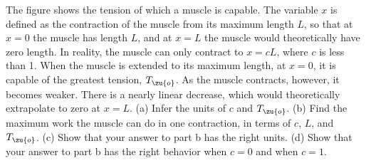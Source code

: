 The figure shows the tension of which a muscle is capable.
The variable $x$ is defined as the contraction of the muscle from its maximum length $L$, so that at
$x=0$ the muscle has length $L$, and at $x=L$ the muscle would theoretically have zero length.
In reality, the muscle can only contract to $x=cL$, where $c$ is less than 1.
When the muscle is extended to its maximum length, at $x=0$, it is capable of the greatest tension, $T_\zu{o}$.
As the muscle contracts, however, it becomes weaker. There is a nearly linear
decrease, which would theoretically extrapolate to zero at $x=L$.
(a)  Infer the units of $c$ and $T_\zu{o}$.
(b) Find the maximum work the muscle can do in one contraction, in terms of $c$, $L$, and $T_\zu{o}$.
(c) Show that your answer to part b has the right units.
(d) Show that your answer to part b has the right behavior when $c=0$ and when $c=1$.\answercheck
